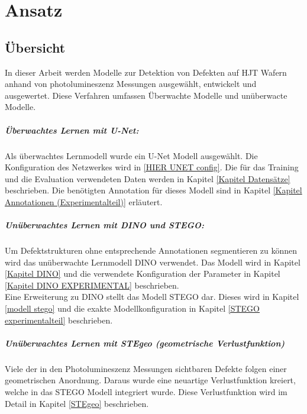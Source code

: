 \chapter{Ansatz}
\label{chap:ansatz}

\section{Übersicht}
\label{ansatz:übersicht}
	In dieser Arbeit werden Modelle zur Detektion von Defekten auf HJT Wafern anhand von photolumineszenz Messungen ausgewählt, entwickelt und ausgewertet. Diese Verfahren umfassen Überwachte Modelle und unüberwacte Modelle. 
	\paragraph{Überwachtes Lernen mit U-Net:} 
	Als überwachtes Lernmodell wurde ein U-Net Modell ausgewählt. Die Konfiguration des Netzwerkes wird in \ref{HIER UNET config}. Die für das Training und die Evaluation verwendeten Daten werden in Kapitel \ref{Kapitel Datensätze} beschrieben. Die benötigten Annotation für dieses Modell sind in Kapitel \ref{Kapitel Annotationen (Experimentalteil)} erläutert. 
	\paragraph{Unüberwachtes Lernen mit DINO und STEGO:}
	Um Defektstrukturen ohne entsprechende Annotationen segmentieren zu können wird das unüberwachte Lernmodell DINO \cite{caron2021emerging} verwendet. Das Modell wird in Kapitel \ref{Kapitel DINO} und die verwendete Konfiguration der Parameter in Kapitel \ref{Kapitel DINO EXPERIMENTAL} beschrieben. \\	
	Eine Erweiterung zu DINO stellt das Modell STEGO \cite{STEGOhamilton2022unsupervised} dar. Dieses wird in Kapitel \ref{modell stego} und die exakte Modellkonfiguration in Kapitel \ref{STEGO experimentalteil} beschrieben.
	\paragraph{Unüberwachtes Lernen mit STEgeo (geometrische Verlustfunktion)}
	Viele der in den Photolumineszenz Messungen sichtbaren Defekte folgen einer geometrischen Anordnung. Daraus wurde eine neuartige Verlustfunktion kreiert, welche in das STEGO Modell integriert wurde. Diese Verlustfunktion wird im Detail in Kapitel \ref{STEgeo} beschrieben. 
	
